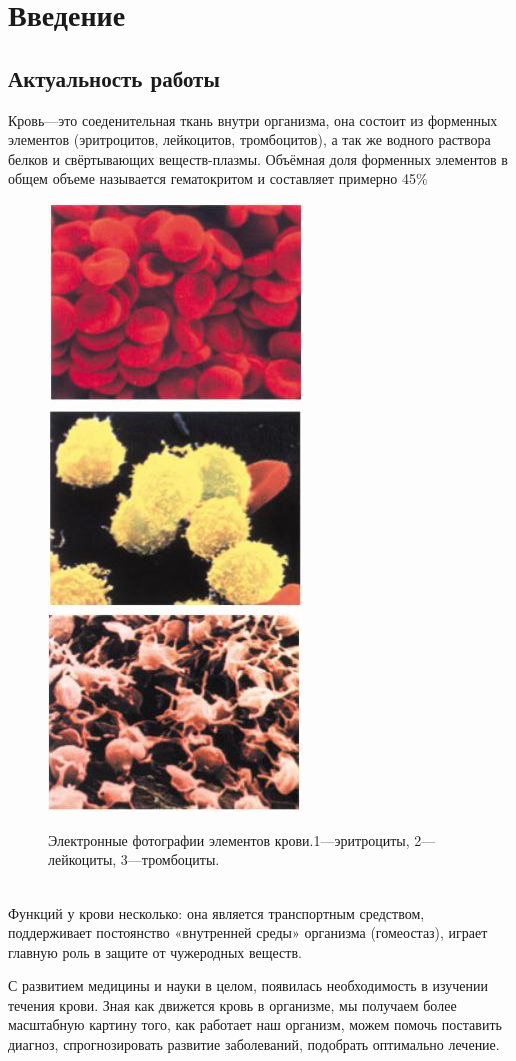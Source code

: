 \documentclass[a4paper, 14pt]{article}
\begin{document}
\newpage
\tableofcontents
\newpage
\section{Введение}
\subsection{Актуальность работы}
Кровь—это соеденительная ткань внутри организма, она состоит из форменных элементов (эритроцитов, лейкоцитов, тромбоцитов), а так же водного раствора белков и свёртывающих веществ-плазмы. Объёмная доля форменных элементов в общем объеме называется гематокритом и составляет примерно 45\%
\begin{figure}[h]
\centering
\includegraphics[width=0.3\linewidth]{erotr.jpg}
\includegraphics[width=0.3\linewidth]{leiko.jpg}
\includegraphics[width=0.3\linewidth]{trombo.jpg}
\caption{ Электронные фотографии элементов крови.1—эритроциты, 2—лейкоциты, 3—тромбоциты. \cite{rls:2003}}
\label{fig:mpr}
\end{figure}\\

Функций у крови несколько: она является транспортным средством, поддерживает постоянство «внутренней среды» организма (гомеостаз), играет главную роль в защите от чужеродных веществ.

С развитием медицины и науки в целом, появилась необходимость в изучении течения крови. Зная как движется кровь в организме, мы получаем более масштабную картину того, как работает наш организм, можем помочь поставить диагноз, спрогнозировать развитие заболеваний, подобрать оптимально лечение.
\end{document}
